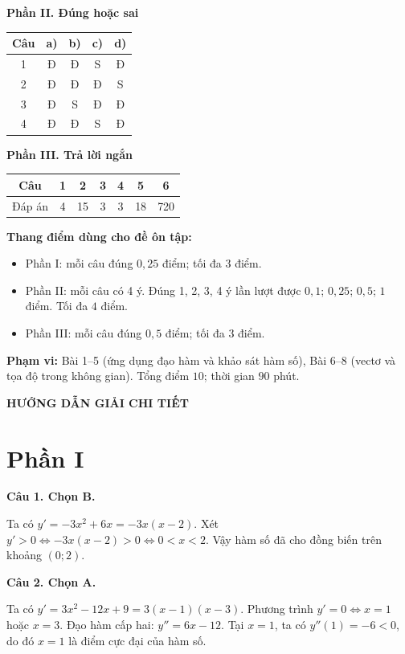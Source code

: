 \documentclass[12pt,a4paper]{article}
\newcommand{\loigiai}[1]{\par\medskip\Needspace{4\baselineskip}\noindent\textbf{#1}\par\nobreak}
\begin{document}
\textbf{Phần II. Đúng hoặc sai}
\begin{center}
\renewcommand{\arraystretch}{1.4}
\begin{tabular}{|c|c|c|c|c|}\hline
Câu & a) & b) & c) & d)\\\hline
1 & Đ & Đ & S & Đ\\\hline
2 & Đ & Đ & Đ & S\\\hline
3 & Đ & S & Đ & Đ\\\hline
4 & Đ & Đ & S & Đ\\\hline
\end{tabular}
\end{center}

\textbf{Phần III. Trả lời ngắn}
\begin{center}
\renewcommand{\arraystretch}{1.5}
\begin{tabular}{|c|c|c|c|c|c|c|}\hline
Câu & 1 & 2 & 3 & 4 & 5 & 6\\\hline
Đáp án & 4 & 15 & 3 & 3 & 18 & 720 \\\hline
\end{tabular}
\end{center}

\textbf{Thang điểm dùng cho đề ôn tập:}
\begin{itemize}[leftmargin=*,itemsep=3pt]
\item Phần I: mỗi câu đúng $0{,}25$ điểm; tối đa $3$ điểm.
\item Phần II: mỗi câu có 4 ý. Đúng 1, 2, 3, 4 ý lần lượt được $0{,}1$; $0{,}25$; $0{,}5$; $1$ điểm. Tối đa $4$ điểm.
\item Phần III: mỗi câu đúng $0{,}5$ điểm; tối đa $3$ điểm.
\end{itemize}
\textbf{Phạm vi:} Bài 1–5 (ứng dụng đạo hàm và khảo sát hàm số), Bài 6–8 (vectơ và tọa độ trong không gian).
Tổng điểm $10$; thời gian $90$ phút.

\newpage
\begin{center}\Large\textbf{HƯỚNG DẪN GIẢI CHI TIẾT}\end{center}
\section*{\large Phần I}
\loigiai{Câu 1. Chọn B.}
Ta có $y'=-3x^2+6x=-3x(x-2)$.
Xét $y'>0\Leftrightarrow -3x(x-2)>0\Leftrightarrow 0<x<2$.
Vậy hàm số đã cho đồng biến trên khoảng $(0;2)$.

\loigiai{Câu 2. Chọn A.}
Ta có $y'=3x^2-12x+9=3(x-1)(x-3)$.
Phương trình $y'=0\Leftrightarrow x=1$ hoặc $x=3$.
Đạo hàm cấp hai: $y''=6x-12$.
Tại $x=1$, ta có $y''(1)=-6<0$, do đó $x=1$ là điểm cực đại của hàm số.
\end{document}
